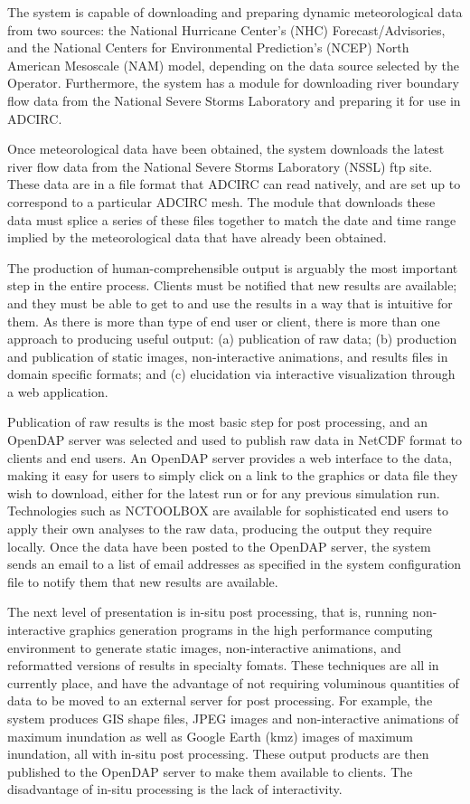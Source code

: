 \documentclass[jmse,article,submit,moreauthors,pdftex,12pt,a4paper]{mdpi}
\begin{document}
The system is capable of downloading and preparing dynamic 
meteorological data from two sources: the National Hurricane 
Center's (NHC) Forecast/Advisories, and the National Centers for 
Environmental Prediction's (NCEP) North American Mesoscale (NAM) 
model, depending on the data source selected by the Operator. 
Furthermore, the system has a module for downloading river boundary 
flow data from the National Severe Storms Laboratory and preparing 
it for use in ADCIRC.

Once meteorological data have been obtained, the system downloads 
the latest river flow data from the National Severe Storms 
Laboratory (NSSL) ftp site. These data are in a file format that 
ADCIRC can read natively, and are set up to correspond to a 
particular ADCIRC mesh. The module that downloads these data must 
splice a series of these files together to match the date and time 
range implied by the meteorological data that have already been 
obtained. 

The production of human-comprehensible output is arguably the most 
important step in the entire process. Clients must be notified that 
new results are available; and they must be able to get to and use 
the results in a way that is  intuitive for them. As there is more 
than type of end user or client, there is more than one approach to 
producing useful output: (a) publication of raw data; (b) production 
and publication of static images, non-interactive animations, and 
results files in domain specific formats; and (c) elucidation via 
interactive visualization through a web application.

Publication of raw results is the most basic step for post 
processing, and an OpenDAP server was selected and used to publish 
raw data in NetCDF format to clients and end users. An OpenDAP 
server provides a web interface to the data, making it easy for 
users to simply click on a link to the graphics or data file they 
wish to download, either for the latest run or for any previous 
simulation run.  Technologies such as NCTOOLBOX are available for 
sophisticated end users to apply their own analyses to the raw data, 
producing the output they require locally.  Once the data have been 
posted to the OpenDAP server, the system sends an email to a list of 
email addresses as specified in the system configuration file to 
notify them that new results are available. 

The next level of presentation is in-situ post processing, that is, 
running non-interactive graphics generation programs in the high 
performance computing environment to generate static images, 
non-interactive animations, and reformatted versions of results in 
specialty fomats. These techniques are all in currently place, and 
have the advantage of not requiring voluminous quantities of data to 
be moved to an external server for post processing. For example, the 
system produces GIS shape files, JPEG images and non-interactive 
animations of maximum inundation as well as Google Earth (kmz) 
images of maximum inundation, all with in-situ post processing. 
These output products are then published to the OpenDAP server to 
make them available to clients. The disadvantage of in-situ 
processing is the lack of interactivity. 
\end{document}

